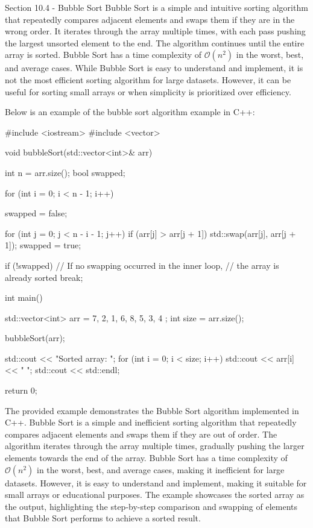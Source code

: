 \begin{notes}{Section 10.4 - Bubble Sort}
    Bubble Sort is a simple and intuitive sorting algorithm that repeatedly compares adjacent elements and swaps them if they are in the wrong order. It iterates through the array multiple times, with each pass pushing the largest unsorted element to the end. The algorithm continues until the entire array is sorted. Bubble Sort has a time complexity of 
    $\mathcal{O}(n^2)$ in the worst, best, and average cases. While Bubble Sort is easy to understand and implement, it is not the most efficient sorting algorithm for large datasets. However, it can be useful for sorting small arrays or when simplicity is prioritized over efficiency.
    
    \begin{highlight}
        Below is an example of the bubble sort algorithm example in C++:
    
    \begin{code}[C++]
    #include <iostream>
    #include <vector>
    
    void bubbleSort(std::vector<int>& arr) {
        int n = arr.size();
        bool swapped;
    
        for (int i = 0; i < n - 1; i++) {
            swapped = false;
    
            for (int j = 0; j < n - i - 1; j++) {
                if (arr[j] > arr[j + 1]) {
                    std::swap(arr[j], arr[j + 1]);
                    swapped = true;
                }
            }
    
            if (!swapped) {
                // If no swapping occurred in the inner loop, 
                // the array is already sorted
                break;
            }
        }
    }
    
    int main() {
        std::vector<int> arr = { 7, 2, 1, 6, 8, 5, 3, 4 };
        int size = arr.size();
    
        bubbleSort(arr);
    
        std::cout << "Sorted array: ";
        for (int i = 0; i < size; i++) {
            std::cout << arr[i] << " ";
        }
        std::cout << std::endl;
    
        return 0;
    }
    \end{code}
        The provided example demonstrates the Bubble Sort algorithm implemented in C++. Bubble Sort is a simple and inefficient sorting algorithm that repeatedly compares adjacent elements and swaps them if they are out of order. The algorithm iterates through the array multiple times, gradually pushing the larger elements towards the end of the array.
        Bubble Sort has a time complexity of $\mathcal{O}(n^2)$ in the worst, best, and average cases, making it inefficient for large datasets. However, it is easy to understand and implement, making it suitable for small arrays or educational purposes. The example showcases the sorted array as the output, highlighting the step-by-step comparison 
        and swapping of elements that Bubble Sort performs to achieve a sorted result.
    \end{highlight}
\end{notes}


